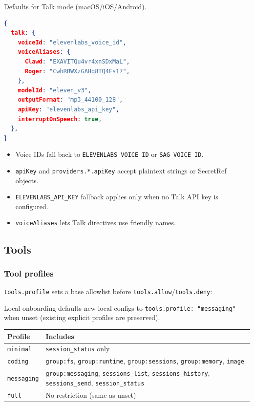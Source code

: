 Defaults for Talk mode (macOS/iOS/Android).

\begin{lstlisting}[language=json]
{
  talk: {
    voiceId: "elevenlabs_voice_id",
    voiceAliases: {
      Clawd: "EXAVITQu4vr4xnSDxMaL",
      Roger: "CwhRBWXzGAHq8TQ4Fs17",
    },
    modelId: "eleven_v3",
    outputFormat: "mp3_44100_128",
    apiKey: "elevenlabs_api_key",
    interruptOnSpeech: true,
  },
}
\end{lstlisting}


\begin{itemize}
  \item Voice IDs fall back to \texttt{ELEVENLABS\_VOICE\_ID} or \texttt{SAG\_VOICE\_ID}.
  \item \texttt{apiKey} and \texttt{providers.*.apiKey} accept plaintext strings or SecretRef objects.
  \item \texttt{ELEVENLABS\_API\_KEY} fallback applies only when no Talk API key is configured.
  \item \texttt{voiceAliases} lets Talk directives use friendly names.
\end{itemize}


\hrulefill


\subsection{Tools}


\subsubsection{Tool profiles}


\texttt{tools.profile} sets a base allowlist before \texttt{tools.allow}/\texttt{tools.deny}:

Local onboarding defaults new local configs to \texttt{tools.profile: "messaging"} when unset (existing explicit profiles are preserved).


\begin{table}[h]
\centering
\small
\begin{tabular}{|l|l|}
\hline
Profile & Includes \\
\hline
\texttt{minimal} & \texttt{session\_status} only \\
\hline
\texttt{coding} & \texttt{group:fs}, \texttt{group:runtime}, \texttt{group:sessions}, \texttt{group:memory}, \texttt{image} \\
\hline
\texttt{messaging} & \texttt{group:messaging}, \texttt{sessions\_list}, \texttt{sessions\_history}, \texttt{sessions\_send}, \texttt{session\_status} \\
\hline
\texttt{full} & No restriction (same as unset) \\
\hline
\end{tabular}
\end{table}



